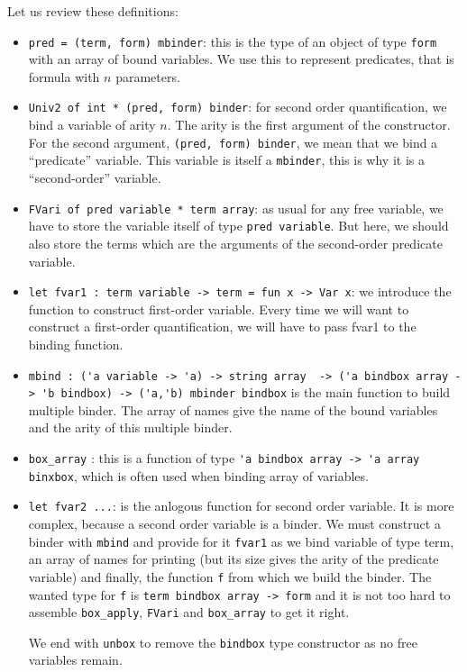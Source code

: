\documentclass[11pt]{article}
\begin{document}
Let us review these definitions:
\begin{itemize}
\item \verb#pred = (term, form) mbinder#: this is the type of an object
of type \verb#form# with an array of bound variables. We use this to
represent predicates, that is formula with $n$ parameters.

\item \verb#Univ2 of int * (pred, form) binder#: for second order
quantification, we bind a variable of arity $n$. The arity is the
first argument of the constructor. For the second argument,
\verb#(pred, form) binder#, we mean that we bind a ``predicate''
variable. This variable is
itself a \verb#mbinder#, this is why it is a ``second-order'' variable.

\item \verb#FVari of pred variable * term array#: as usual
for any free variable, we have to store
the variable itself of type \verb#pred variable#.
But here, we should also store the terms which
are the arguments of the second-order predicate variable.

\item \verb#let fvar1 : term variable -> term = fun x -> Var x#: we introduce the
function to construct first-order variable. Every time we will want to
construct a first-order quantification, we will have to pass fvar1 to
the binding function.

\item \verb#mbind : ('a variable -> 'a) -> string array  -> ('a bindbox array -> 'b bindbox) -> ('a,'b) mbinder bindbox# is
  the main function to build multiple binder. The array of names give
  the name of the bound variables and the arity of this multiple binder.

\item \verb#box_array# : this is a function of type
  \verb#'a bindbox array -> 'a array binxbox#, which is often used when
  binding array of variables.

\item \verb#let fvar2 ...#: is the anlogous function for second order
  variable. It is more complex, because a second order variable is a
  binder. We must construct a binder with \verb#mbind# and provide for
  it \verb#fvar1# as we bind variable of type term, an array of names for
  printing
  (but its size gives the arity of the predicate variable) and
  finally, the function \verb#f# from which we build the binder. The wanted
  type for \verb#f# is \verb#term bindbox array -> form# and it is not
  too hard to assemble \verb#box_apply#, \verb#FVari# and
  \verb#box_array# to get it right.

  We end with \verb#unbox# to remove the \verb#bindbox# type
  constructor as no free variables remain.
\end{itemize}
\end{document}
